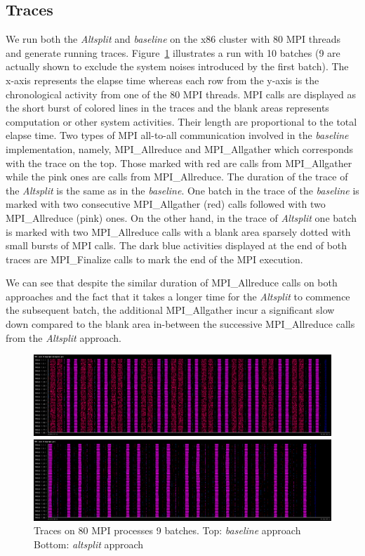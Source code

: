 \subsection{Traces}
\label{sec:altsplit_trace}
We run both the \emph{Altsplit} and \emph{baseline} on the x86 cluster with
80 MPI threads and generate running traces. Figure~\ref{fig:altsplit_traces}
illustrates a run with 10 batches (9 are actually shown to exclude the system
noises introduced by the first batch). The x-axis represents the elapse time
whereas each row from the y-axis is the chronological activity from one of
the 80 MPI threads. MPI calls are displayed as the short burst of colored
lines in the traces and the blank areas represents computation or other
system activities. Their length are proportional to the total elapse time.
Two types of MPI all-to-all communication involved in the \emph{baseline}
implementation, namely, MPI\_Allreduce and MPI\_Allgather which corresponds
with the trace on the top. Those marked with red are calls from
MPI\_Allgather while the pink ones are calls from MPI\_Allreduce. The
duration of the trace of the \emph{Altsplit} is the same as in the
\emph{baseline}. One batch in the trace of the \emph{baseline} is marked with
two consecutive MPI\_Allgather (red) calls followed with two MPI\_Allreduce
(pink) ones. On the other hand, in the trace of \emph{Altsplit} one batch is
marked with two MPI\_Allreduce calls with a blank area sparsely dotted with small
bursts of MPI calls. The dark blue activities displayed at the end of both
traces are MPI\_Finalize calls to mark the end of the MPI execution.

We can see that despite the similar duration of MPI\_Allreduce calls on both
approaches and the fact that it takes a longer time for the \emph{Altsplit} to 
commence the subsequent batch, the additional MPI\_Allgather incur a significant 
slow down compared to the blank area in-between the successive MPI\_Allreduce 
calls from the \emph{Altsplit} approach.

\begin{figure}[H]
    \centerline{\includegraphics[scale=0.30]{altsplit/figs/baseline_trace.png}}
    \centerline{\includegraphics[scale=0.30]{altsplit/figs/altsplit_trace.png}}
    \caption{Traces on 80 MPI processes 9 batches. Top: \emph{baseline} approach Bottom: \emph{altsplit} approach}
    \label{fig:altsplit_traces}
\end{figure}